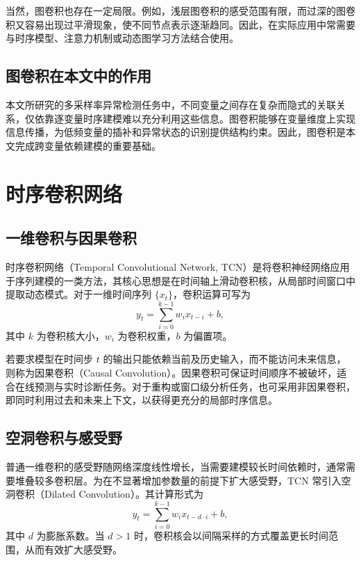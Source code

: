当然，图卷积也存在一定局限。例如，浅层图卷积的感受范围有限，而过深的图卷积又容易出现过平滑现象，使不同节点表示逐渐趋同。因此，在实际应用中常需要与时序模型、注意力机制或动态图学习方法结合使用。

\subsection{图卷积在本文中的作用}

本文所研究的多采样率异常检测任务中，不同变量之间存在复杂而隐式的关联关系，仅依靠逐变量时序建模难以充分利用这些信息。图卷积能够在变量维度上实现信息传播，为低频变量的插补和异常状态的识别提供结构约束。因此，图卷积是本文完成跨变量依赖建模的重要基础。

\section{时序卷积网络}

\subsection{一维卷积与因果卷积}

时序卷积网络（Temporal Convolutional Network, TCN）是将卷积神经网络应用于序列建模的一类方法，其核心思想是在时间轴上滑动卷积核，从局部时间窗口中提取动态模式。对于一维时间序列 $\{x_t\}$，卷积运算可写为
\begin{equation}
    y_t = \sum_{i=0}^{k-1} w_i x_{t-i} + b,
\end{equation}
其中 $k$ 为卷积核大小，$w_i$ 为卷积权重，$b$ 为偏置项。

若要求模型在时间步 $t$ 的输出只能依赖当前及历史输入，而不能访问未来信息，则称为因果卷积（Causal Convolution）。因果卷积可保证时间顺序不被破坏，适合在线预测与实时诊断任务。对于重构或窗口级分析任务，也可采用非因果卷积，即同时利用过去和未来上下文，以获得更充分的局部时序信息。

\subsection{空洞卷积与感受野}

普通一维卷积的感受野随网络深度线性增长，当需要建模较长时间依赖时，通常需要堆叠较多卷积层。为在不显著增加参数量的前提下扩大感受野，TCN 常引入空洞卷积（Dilated Convolution）。其计算形式为
\begin{equation}
    y_t = \sum_{i=0}^{k-1} w_i x_{t-d \cdot i} + b,
\end{equation}
其中 $d$ 为膨胀系数。当 $d > 1$ 时，卷积核会以间隔采样的方式覆盖更长时间范围，从而有效扩大感受野。

